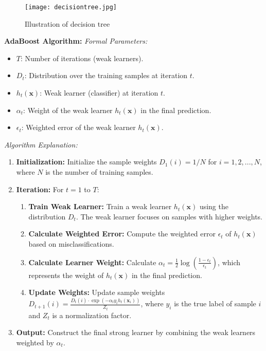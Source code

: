 \documentclass[conference]{IEEEtran}
\begin{document}
\begin{figure}[H]
\texttt{[image: decisiontree.jpg]}
\caption{Illustration of decision tree\textcolor{blue}{\citep{ramalingam2018heart}} }
\label{dectree} 
\end{figure}
 
\item \textbf{AdaBoost Algorithm:}
\newline
\textit{Formal Parameters:}
\begin{itemize}
    \item $T$: Number of iterations (weak learners).
    \item $D_t$: Distribution over the training samples at iteration $t$.
    \item $h_t(\mathbf{x})$: Weak learner (classifier) at iteration $t$.
    \item $\alpha_t$: Weight of the weak learner $h_t(\mathbf{x})$ in the final prediction.
    \item $\epsilon_t$: Weighted error of the weak learner $h_t(\mathbf{x})$.
\end{itemize}

\textit{Algorithm Explanation:}
\begin{enumerate}
    \item \textbf{Initialization:} Initialize the sample weights $D_1(i) = 1/N$ for $i = 1, 2, ..., N$, where $N$ is the number of training samples.
    \item \textbf{Iteration:} For $t = 1$ to $T$:
        \begin{enumerate}
            \item \textbf{Train Weak Learner:} Train a weak learner $h_t(\mathbf{x})$ using the distribution $D_t$. The weak learner focuses on samples with higher weights.
            \item \textbf{Calculate Weighted Error:} Compute the weighted error $\epsilon_t$ of $h_t(\mathbf{x})$ based on misclassifications.
            \item \textbf{Calculate Learner Weight:} Calculate $\alpha_t = \frac{1}{2} \log \left(\frac{1 - \epsilon_t}{\epsilon_t}\right)$, which represents the weight of $h_t(\mathbf{x})$ in the final prediction.
            \item \textbf{Update Weights:} Update sample weights $D_{t+1}(i) = \frac{D_t(i) \cdot \exp(-\alpha_t y_i h_t(\mathbf{x}_i))}{Z_t}$, where $y_i$ is the true label of sample $i$ and $Z_t$ is a normalization factor.
        \end{enumerate}
    \item \textbf{Output:} Construct the final strong learner by combining the weak learners weighted by $\alpha_t$.
\end{enumerate}
\end{document}
